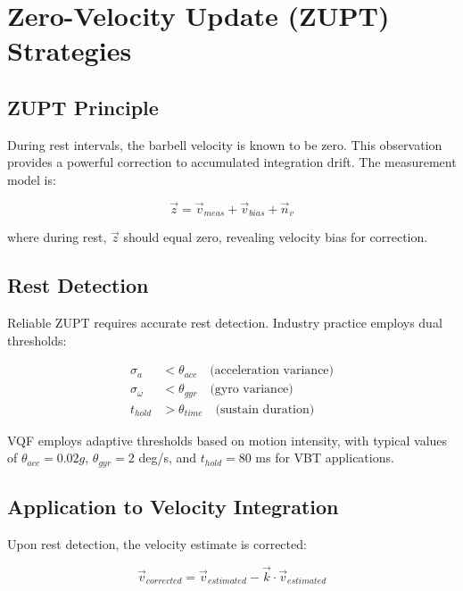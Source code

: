 \section{Zero-Velocity Update (ZUPT) Strategies}

\subsection{ZUPT Principle}

During rest intervals, the barbell velocity is known to be zero. This observation provides a powerful correction to accumulated integration drift. The measurement model is:

\begin{equation}
    \vec{z} = \vec{v}_{meas} + \vec{v}_{bias} + \vec{n}_v
\end{equation}

where during rest, $\vec{z}$ should equal zero, revealing velocity bias for correction.

\subsection{Rest Detection}

Reliable ZUPT requires accurate rest detection. Industry practice employs dual thresholds:

\begin{align}
    \sigma_a &< \theta_{acc} \quad \text{(acceleration variance)} \\
    \sigma_\omega &< \theta_{gyr} \quad \text{(gyro variance)} \\
    t_{hold} &> \theta_{time} \quad \text{(sustain duration)}
\end{align}

VQF employs adaptive thresholds based on motion intensity, with typical values of $\theta_{acc} = 0.02g$, $\theta_{gyr} = 2$ deg/s, and $t_{hold} = 80$ ms for VBT applications.

\subsection{Application to Velocity Integration}

Upon rest detection, the velocity estimate is corrected:

\begin{equation}
    \vec{v}_{corrected} = \vec{v}_{estimated} - \vec{k} \cdot \vec{v}_{estimated}
\end{equation}

